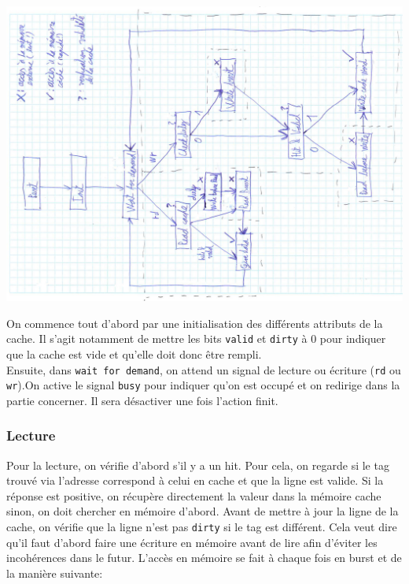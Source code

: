 \documentclass[10pt,a4paper]{article}
\begin{document}
\begin{center}

\includegraphics[width=1.3\textwidth, angle=-90]{images/mss}

\end{center}

\newpage

On commence tout d'abord par une initialisation des différents attributs de la cache. Il s'agit notamment de mettre les bits \texttt{valid} et \texttt{dirty} à 0 pour indiquer que la cache est vide et qu'elle doit donc être rempli.\\

Ensuite, dans \texttt{wait for demand}, on attend un signal de lecture ou écriture (\texttt{rd} ou \texttt{wr}).On active le signal \texttt{busy} pour indiquer qu'on est occupé et on redirige dans la partie concerner. Il sera désactiver une fois l'action finit.

\subsubsection{Lecture}
Pour la lecture, on vérifie d'abord s'il y a un hit. Pour cela, on regarde si le tag trouvé via l'adresse correspond à celui en cache et que la ligne est valide.
Si la réponse est positive, on récupère directement la valeur dans la mémoire cache sinon, on doit chercher en mémoire d'abord. Avant de mettre à jour la ligne de la cache, on vérifie que la ligne n'est pas \texttt{dirty} si le tag est différent. Cela veut dire qu'il faut d'abord faire une écriture en mémoire avant de lire afin d'éviter les incohérences dans le futur.
L'accès en mémoire se fait à chaque fois en burst et de la manière suivante:
\end{document}
